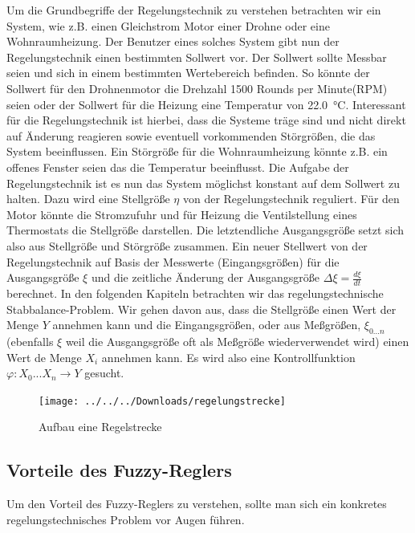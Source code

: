 \documentclass[12pt,a4paper,bibliography=totocnumbered,listof=totocnumbered]{scrartcl}
\theoremstyle{Umgebung}
\begin{document}
Um die Grundbegriffe der Regelungstechnik zu verstehen betrachten wir ein System, wie z.B. einen Gleichstrom Motor einer Drohne oder eine Wohnraumheizung. Der Benutzer eines solches System gibt nun der Regelungstechnik einen bestimmten Sollwert vor. Der Sollwert sollte Messbar seien und sich in einem bestimmten Wertebereich befinden. So könnte der Sollwert für den Drohnenmotor die Drehzahl 1500 Rounds per Minute(RPM) seien oder der Sollwert für die Heizung eine Temperatur von \SI{22.0}{\celsius}. Interessant für die Regelungstechnik ist hierbei, dass die Systeme träge sind und nicht direkt auf Änderung reagieren sowie eventuell vorkommenden Störgrößen, die das System beeinflussen. Ein Störgröße für die Wohnraumheizung könnte z.B. ein offenes Fenster seien das die Temperatur beeinflusst. Die Aufgabe der Regelungstechnik ist es nun das System möglichst konstant auf dem Sollwert zu halten. Dazu wird eine Stellgröße $\eta$ von der Regelungstechnik reguliert. Für den Motor könnte die Stromzufuhr und für Heizung die Ventilstellung eines Thermostats die Stellgröße darstellen. Die letztendliche Ausgangsgröße setzt sich also aus Stellgröße und Störgröße zusammen. Ein neuer Stellwert von der Regelungstechnik auf Basis der Messwerte (Eingangsgrößen) für die Ausgangsgröße $\xi$ und die zeitliche Änderung der Ausgangsgröße $\Delta\xi = \frac{d\xi}{dt}$ berechnet. In den folgenden Kapiteln betrachten wir das regelungstechnische Stabbalance-Problem. Wir gehen davon aus, dass die Stellgröße einen Wert der Menge $Y$ annehmen kann  und die Eingangsgrößen, oder aus Meßgrößen, $\xi_{0...n}$ (ebenfalls $\xi$ weil die Ausgangsgröße oft als Meßgröße wiederverwendet wird) einen Wert de Menge $X_i$ annehmen kann. Es wird also eine Kontrollfunktion $\varphi: X_0...X_n \rightarrow Y$ gesucht.

\begin{figure}
	\centering
	\texttt{[image: ../../../Downloads/regelungstrecke]}
	\caption[Aufbau einer Regelstrecke]{Aufbau eine Regelstrecke}
	\label{fig:regelungstrecke}
\end{figure}


\subsection{Vorteile des Fuzzy-Reglers}

Um den Vorteil des Fuzzy-Reglers zu verstehen, sollte man sich ein konkretes regelungstechnisches Problem vor Augen führen.
\end{document}
